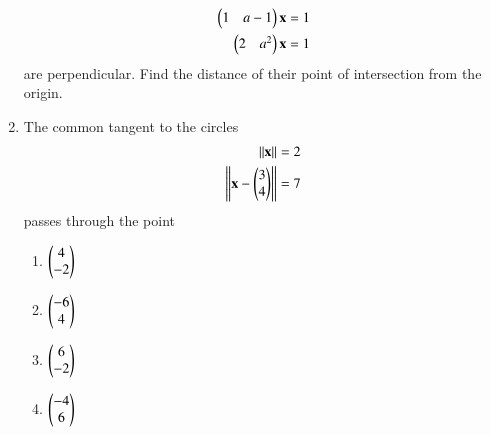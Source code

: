 \documentclass[journal,12pt,twocolumn]{IEEEtran}
\begin{document}
\begin{enumerate}[label=\arabic*.]
\begin{align}
\begin{pmatrix}1 & a-1 \end{pmatrix}\mathbf{x}  &=1
\\
\begin{pmatrix}2 & a^2 \end{pmatrix}\mathbf{x}  &=1
\end{align}
%
are perpendicular. Find the distance of their point of intersection from the origin.
%
\item The common tangent to the circles 
\begin{align}
\left\Vert\mathbf{x}\right\Vert&= 2
\\
\left\Vert\mathbf{x}-\begin{pmatrix} 3 \\ 4 \end{pmatrix}\right\Vert&= 7
\end{align}
passes through the point  
\begin{enumerate}
\item $\begin{pmatrix}4\\-2\end{pmatrix}$
\item $\begin{pmatrix}-6\\4\end{pmatrix}$
\item $\begin{pmatrix}6\\-2\end{pmatrix}$
\item $\begin{pmatrix}-4\\6\end{pmatrix}$


\end{enumerate}
\end{enumerate}
\end{document}
